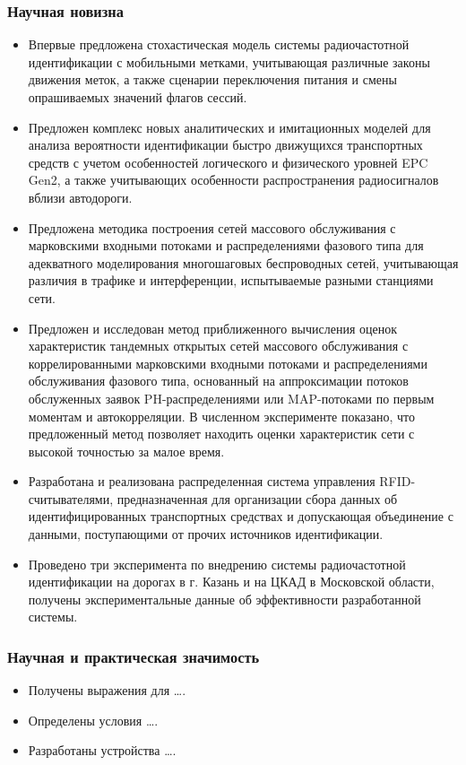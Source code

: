 \begin{frame}[allowframebreaks]
    \frametitle{Научная новизна}
    \begin{itemize}
        \item Впервые предложена стохастическая модель системы радиочастотной идентификации с мобильными метками, учитывающая различные законы движения меток, а также сценарии переключения питания и смены опрашиваемых значений флагов сессий.
        \item Предложен комплекс новых аналитических и имитационных моделей для анализа вероятности идентификации быстро движущихся транспортных средств с учетом особенностей логического и физического уровней EPC Gen2, а также учитывающих особенности распространения радиосигналов вблизи автодороги.
        \item Предложена методика построения сетей массового обслуживания с марковскими входными потоками и распределениями фазового типа для адекватного моделирования многошаговых беспроводных сетей, учитывающая различия в трафике и интерференции, испытываемые разными станциями сети.
        \framebreak
        \item Предложен и исследован метод приближенного вычисления оценок характеристик тандемных открытых сетей массового обслуживания с коррелированными марковскими входными потоками и распределениями обслуживания фазового типа, основанный на аппроксимации потоков обслуженных заявок PH-распределениями или MAP-потоками по первым моментам и автокорреляции. В численном эксперименте показано, что предложенный метод позволяет находить оценки характеристик сети с высокой точностью за малое время.
        \item Разработана и реализована распределенная система управления RFID-считывателями, предназначенная для организации сбора данных об идентифицированных транспортных средствах и допускающая объединение с данными, поступающими от прочих источников идентификации.
        \item Проведено три эксперимента по внедрению системы радиочастотной идентификации на дорогах в г. Казань и на ЦКАД в Московской области, получены экспериментальные данные об эффективности разработанной системы.
          \end{itemize}
\end{frame}

\begin{frame}
    \frametitle{Научная и практическая значимость}
    \begin{itemize}
        \item Получены выражения для \dots.
        \item Определены условия \dots.
        \item Разработаны устройства \dots.
    \end{itemize}
\end{frame}

